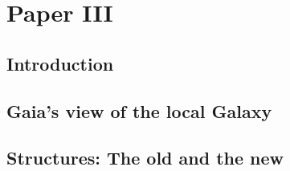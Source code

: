 \chapter{Paper III}\label{chap:paper3}
\section{Introduction}\label{sec:p3-intro}

\section{Gaia's view of the local Galaxy}\label{sec:p3-gaiaview}

\section{Structures: The old and the new}\label{sec:p3-structures}